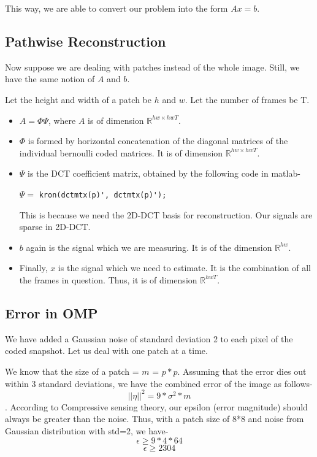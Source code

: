 \documentclass[a4paper,11pt]{article}
\numberwithin{definition}{section}
\numberwithin{mytheorem}{subsection}
\begin{document}
This way, we are able to convert our problem into the form $Ax=b$.

\subsection{Pathwise Reconstruction}

Now suppose we are dealing with patches instead of the whole image. Still, we have the same notion of $A$ and $b$.

Let the height and width of a patch be $h$ and $w$. Let the number of frames be T.

\begin{itemize}
    \item $A = \Phi \Psi $, where $A$ is of dimension $\mathbb{R}^{hw \times hwT}$.
    \item $\Phi$ is formed by horizontal concatenation of the diagonal matrices of the individual bernoulli coded matrices. It is of dimension $\mathbb{R}^{hw \times hwT}$.
    \item $\Psi$ is the DCT coefficient matrix, obtained by the following code in matlab-\\
    \begin{center}
        $\Psi =$ \verb|kron(dctmtx(p)', dctmtx(p)');|\\
    \end{center}
    This is because we need the 2D-DCT basis for reconstruction. Our signals are sparse in 2D-DCT.    
    \item $b$ again is the signal which we are measuring. It is of the dimension $\mathbb{R}^{hw}$.
    \item Finally, $x$ is the signal which we need to estimate. It is the combination of all the frames in question. Thus, it is of dimension $\mathbb{R}^{hwT}$.
\end{itemize}

\subsection{Error in OMP}

We have added a Gaussian noise of standard deviation 2 to each pixel of the coded snapshot. Let us deal with one patch at a time.

We know that the size of a patch = $m$ = $p*p$. Assuming that the error dies out within 3 standard deviations, we have the combined error of the image as follows-
$$ ||\eta||^2 = 9*\sigma^2*m $$.
According to Compressive sensing theory, our epsilon (error magnitude) should always be greater than the noise. Thus, with a patch size of 8*8 and noise from Gaussian distribution with std=2, we have-
$$ \epsilon \geq 9*4*64 $$
$$ \epsilon \geq 2304 $$
\end{document}
